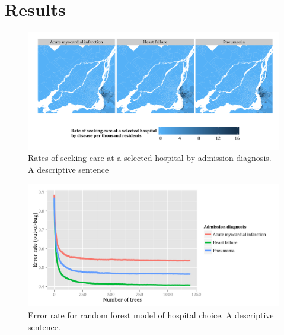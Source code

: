 \documentclass[]{article}\usepackage[]{graphicx}\usepackage[]{color}
\begin{document}
\section{Results}
\begin{figure}[H]
    \includegraphics{../figures/hosp_choro.png}
    \caption[Rates of seeking care at a selected hospital by admission diagnosis.]
      {Rates of seeking care at a selected hospital by admission diagnosis. A descriptive sentence}
    \label{fig:hosp_choro}
\end{figure}

\begin{figure}[H]
    \includegraphics{../figures/error_rate_for_hospital_choice.png}
    \caption[Error rate for random forest model of hospital choice.]
      {Error rate for random forest model of hospital choice. A descriptive sentence.}
    \label{fig:error_rate_for_hospital_choice}
\end{figure}
\end{document}
